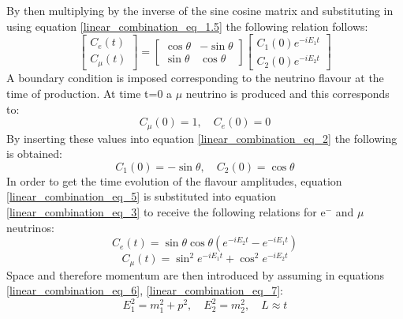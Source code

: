By then multiplying by the inverse of the sine cosine matrix and substituting in using equation \ref{linear_combination_eq_1.5} the following relation follows:
\begin{equation}
    \begin{bmatrix}
        C_e(t) \\
        C_\mu(t)
    \end{bmatrix}
    =
    \begin{bmatrix}
        \cos\theta & -\sin\theta \\
        \sin\theta & \cos\theta 
    \end{bmatrix}
        \begin{bmatrix}
        C_1(0)e^{-iE_1t} \\
        C_2(0)e^{-iE_2t}
    \end{bmatrix}
    \label{linear_combination_eq_3}
\end{equation}
A boundary condition is imposed corresponding to the neutrino flavour at the time of production. At time t=0 a $\mu$ neutrino is produced and this corresponds to:
\begin{equation}
    C_\mu(0) = 1, \quad C_e(0) = 0
    \label{linear_combination_eq_4}
\end{equation}
By inserting these values into equation \ref{linear_combination_eq_2} the following is obtained:
\begin{equation}
    C_1(0) = -\sin\theta, \quad C_2(0) = \cos\theta
    \label{linear_combination_eq_5}
\end{equation}
In order to get the time evolution of the flavour amplitudes, equation \ref{linear_combination_eq_5} is substituted into equation \ref{linear_combination_eq_3} to receive the following relations for e$^-$ and $\mu$ neutrinos: 
\begin{equation}
    C_e(t)=\sin\theta\cos\theta(e^{-iE_2t}-e^{-iE_1t})
    \label{linear_combination_eq_6}
\end{equation}
\begin{equation}
    C_\mu(t)=\sin^{2}e^{-iE_1t} + \cos^{2}e^{-iE_2t}
    \label{linear_combination_eq_7}
\end{equation}
Space and therefore momentum are then introduced by assuming in equations \ref{linear_combination_eq_6}, \ref{linear_combination_eq_7}: 
\begin{equation}
   E_1^2=m_1^2 + p^2, \quad E_2^2=m_2^2  , \quad L \approx t
    \label{linear_combination_eq_8}
\end{equation}
